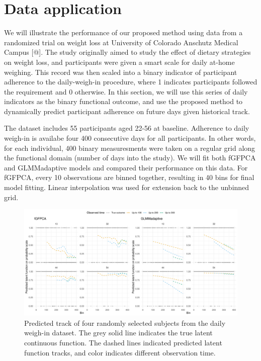 \documentclass[
  11pt,
]{article}
\begin{document}
\hypertarget{data-application}{%
\section{Data application}\label{data-application}}

We will illustrate the performance of our proposed method using data
from a randomized trial on weight loss at University of Colorado
Anschutz Medical Campus {[}@{]}. The study originally aimed to study the
effect of dietary strategies on weight loss, and participants were given
a smart scale for daily at-home weighing. This record was then scaled
into a binary indicator of participant adherence to the daily-weigh-in
procedure, where 1 indicates participants followed the requirement and 0
otherwise. In this section, we will use this series of daily indicators
as the binary functional outcome, and use the proposed method to
dynamically predict participant adherence on future days given
historical track.

The dataset includes 55 participants aged 22-56 at baseline. Adherence
to daily weigh-in is availabe four 400 consecutive days for all
participants. In other words, for each individual, 400 binary
measuresments were taken on a regular grid along the functional domain
(number of days into the study). We will fit both fGFPCA and
GLMMadaptive models and compared their performance on this data. For
fGFPCA, every 10 observations are binned together, resulting in 40 bins
for final model fitting. Linear interpolation was used for extension
back to the unbinned grid.

\begin{figure}
\centering
\includegraphics{Manuscript_files/figure-latex/Figure_appl-1.pdf}
\caption{Predicted track of four randomly selected subjects from the
daily weigh-in dataset. The grey solid line indicates the true latent
continuous function. The dashed lines indicated predicted latent
function tracks, and color indicates different observation time.}
\end{figure}
\end{document}
